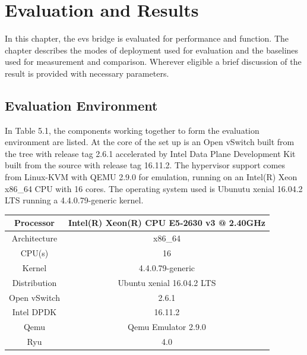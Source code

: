 \chapter{Evaluation and Results}
In this chapter, the \ac{evs} bridge is evaluated for performance and function. The chapter describes the modes of deployment used for evaluation and the baselines used for measurement and comparison. Wherever eligible a brief discussion of the result is provided with necessary parameters. 


\section{Evaluation Environment}
In Table 5.1, the components working together to form the evaluation environment are listed. At the core of the set up is an Open vSwitch built from the tree with release tag 2.6.1 accelerated by Intel Data Plane Development Kit built from the source with release tag 16.11.2. The hypervisor support comes from Linux-KVM with QEMU 2.9.0 for emulation, running on an Intel(R) Xeon x86_64 CPU with 16 cores. The operating system used is Ubunutu xenial 16.04.2 LTS running a 4.4.0.79-generic kernel. 
\begin{center}
  \label{tab:title} 
 \begin{tabular}{ |c|c| } 
  \hline
  Processor &  Intel(R) Xeon(R) CPU E5-2630 v3 @ 2.40GHz  \\
  \hline 
  Architecture &  x86_64  \\ 
  \hline
  CPU(s) & 16  \\ 
  \hline
  Kernel & 4.4.0.79-generic \\
  \hline
  Distribution & Ubuntu xenial 16.04.2 LTS \\
  \hline
  Open vSwitch & 2.6.1 \\
  \hline
  Intel DPDK & 16.11.2 \\
  \hline
  Qemu & Qemu Emulator 2.9.0 \\
  \hline
  Ryu & 4.0 \\
  \hline  
 \end{tabular}
\end{center}

